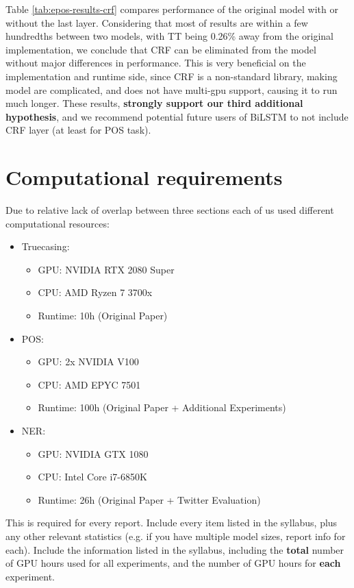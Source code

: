\documentclass[11pt,a4paper]{article}
\begin{document}
    Table \ref{tab:epos-results-crf} compares performance of the original model with or without the last layer. Considering that most of results are within a few hundredths between two models, with TT being 0.26\% away from the original implementation, we conclude that CRF can be eliminated from the model without major differences in performance. This is very beneficial on the implementation and runtime side, since CRF is a non-standard library, making model are complicated, and does not have multi-gpu support, causing it to run much longer. These results, \textbf{strongly support our third additional hypothesis}, and we recommend potential future users of BiLSTM to not include CRF layer (at least for POS task).

\section{Computational requirements}
Due to relative lack of overlap between three sections each of us used different computational resources:
\begin{itemize}
    \item Truecasing:
    \begin{itemize}
        \item GPU: NVIDIA RTX 2080 Super
        \item CPU: AMD Ryzen 7 3700x
        \item Runtime: 10h (Original Paper)
    \end{itemize}
    \item POS:
    \begin{itemize}
        \item GPU: 2x NVIDIA V100
        \item CPU: AMD EPYC 7501
        \item Runtime: 100h (Original Paper + Additional Experiments)
    \end{itemize}
    \item NER:
    \begin{itemize}
        \item GPU: NVIDIA GTX 1080
        \item CPU: Intel Core i7-6850K
        \item Runtime: 26h (Original Paper + Twitter Evaluation)
    \end{itemize}
\end{itemize}

This is required for every report. Include every item listed in the syllabus, plus any other relevant statistics (e.g. if you have multiple model sizes, report info for each).
Include the information listed in the syllabus, including the \textbf{total} number of GPU hours used for all experiments, and the number of GPU hours for \textbf{each} experiment.
\end{document}
